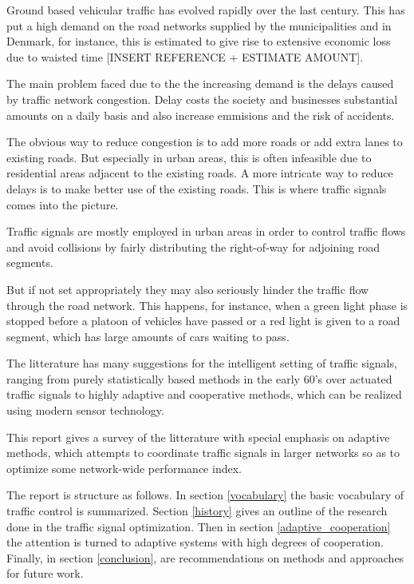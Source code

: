 Ground based vehicular traffic has evolved rapidly over the last century. This has put a high demand on the road networks supplied by the municipalities and in Denmark, for instance, this is estimated to give rise to extensive economic loss due to waisted time [INSERT REFERENCE + ESTIMATE AMOUNT]. 

The main problem faced due to the the increasing demand is the delays caused by traffic network congestion. Delay costs the society and businesses substantial amounts on a daily basis and also increase emmisions and the risk of accidents.

The obvious way to reduce congestion is to add more roads or add extra lanes to existing roads. But especially in urban areas, this is often infeasible due to residential areas adjacent to the existing roads. 
A more intricate way to reduce delays is to make better use of the existing roads. This is where traffic signals comes into the picture. 

Traffic signals are mostly employed in urban areas in order to control traffic flows and avoid collisions by fairly distributing the right-of-way for adjoining road segments.

But if not set appropriately they may also seriously hinder the traffic flow through the road network. This happens, for instance, when a green light phase is stopped before a platoon of vehicles have passed or a red light is given to a road segment, which has large amounts of cars waiting to pass.

The litterature has many suggestions for the intelligent setting of traffic signals, ranging from purely statistically based methods in the early 60's over actuated traffic signals to highly adaptive and cooperative methods, which can be realized using modern sensor technology. 

This report gives a survey of the litterature with special emphasis on adaptive methods, which attempts to coordinate traffic signals in larger networks so as to optimize some network-wide performance index.

The report is structure as follows. In section \ref{vocabulary} the basic vocabulary of traffic control is summarized. Section \ref{history} gives an outline of the research done in the traffic signal optimization. Then in section \ref{adaptive_cooperation} the attention is turned to adaptive systems with high degrees of cooperation.
Finally, in section \ref{conclusion}, are recommendations on methods and approaches for future work.
